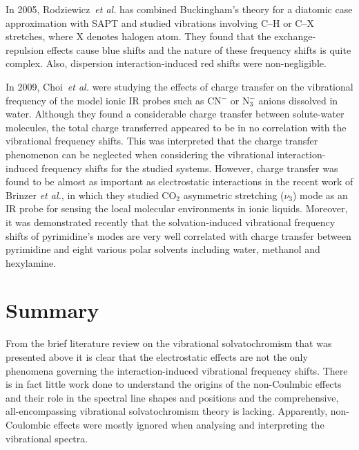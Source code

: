 \documentclass[a4paper,titlepage,twoside,fleqn,12pt]{book}
\begin{document}
\begin{refsection}
In 2005, Rodziewicz~\emph{et al.} has combined Buckingham's theory for a diatomic case approximation with SAPT 
and studied vibrations involving C--H or C--X
stretches, where X denotes halogen atom. \citep{Rodziewicz.Rutkowski.Melikova.Koll.ChemPhysChem.2005} 
They found that the exchange\hyp{}repulsion effects
cause blue shifts and the nature of these frequency shifts is quite complex. Also, dispersion
interaction\hyp{}induced red shifts were non\hyp{}negligible. 

In 2009, Choi~\emph{et al.} were studying the effects of charge transfer on the vibrational
frequency of the model ionic IR probes such as CN$^-$ or N$_3^-$ anions dissolved in water. \citep{Lee.Choi.Cho.PCCP.2010}
Although they found a considerable charge
transfer between solute\hyp{}water molecules, the total charge transferred appeared to be in no
correlation with the vibrational frequency shifts. This was interpreted that the charge transfer 
phenomenon can be neglected when considering the vibrational interaction\hyp{}induced frequency shifts
for the studied systems. However, charge transfer was found to be almost as important as electrostatic
interactions in the 
recent work of Brinzer \emph{et al.}, \citep{Brinzer.Berquist.Zhe.Dutta.Johnson.Krisher.Lambrecht.Garrett-Roe.JCP.2015} 
in which they studied CO$_2$ asymmetric
stretching ($\nu_3$) mode as an IR probe for sensing the local molecular environments in ionic
liquids. Moreover, it was demonstrated recently that the solvation\hyp{}induced vibrational
frequency shifts of pyrimidine's modes are very well correlated with charge transfer between
pyrimidine and eight various polar solvents including water, methanol
and hexylamine. \citep{Wright.Howard.Howard.Tschumper.Hammer.JPCA.2013}

\section{Summary}

From the brief literature review on the vibrational solvatochromism
that was presented above it is clear that the electrostatic effects
are not the only phenomena governing the interaction\hyp{}induced 
vibrational frequency shifts. There is in fact little work done
to understand the origins of the non\hyp{}Coulmbic effects and their
role in the spectral line shapes and positions and the comprehensive,
all\hyp{}encompassing vibrational solvatochromism theory is lacking. Apparently,
non\hyp{}Coulombic effects were mostly ignored when analysing and interpreting
the vibrational spectra.


\end{refsection}
\end{document}

